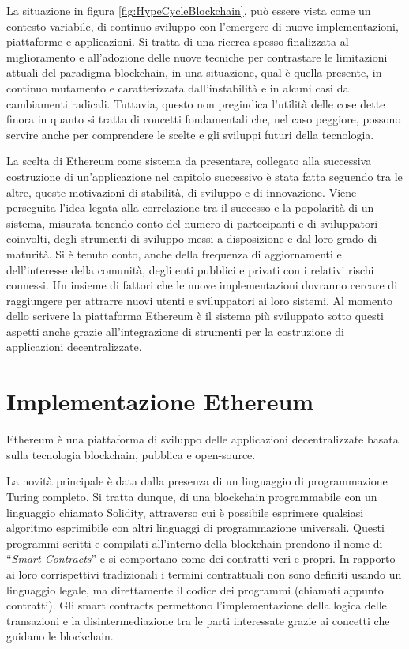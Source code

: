 La situazione in figura \ref{fig:HypeCycleBlockchain}, può essere vista come un contesto variabile, di continuo sviluppo con l’emergere di nuove implementazioni, piattaforme e applicazioni. Si tratta di una ricerca spesso finalizzata al miglioramento e all'adozione delle nuove tecniche per contrastare le limitazioni attuali del paradigma blockchain, in una situazione, qual è quella presente, in continuo mutamento e caratterizzata dall'instabilità e in alcuni casi da cambiamenti radicali. Tuttavia, questo non pregiudica l’utilità delle cose dette finora in quanto si tratta di concetti fondamentali che, nel caso peggiore, possono servire anche per comprendere le scelte e gli sviluppi futuri della tecnologia.

La scelta di Ethereum come sistema da presentare, collegato alla successiva costruzione di un’applicazione nel capitolo successivo è stata fatta seguendo tra le altre, queste motivazioni di stabilità, di sviluppo e di innovazione. Viene perseguita l'idea legata alla correlazione tra il successo e la popolarità di un sistema, misurata tenendo conto del numero di partecipanti e di sviluppatori coinvolti, degli strumenti di sviluppo messi a disposizione e dal loro grado di maturità. Si è tenuto conto, anche della frequenza di aggiornamenti e dell’interesse della comunità, degli enti pubblici e privati con i relativi rischi connessi. Un insieme di fattori che le nuove implementazioni dovranno cercare di raggiungere per attrarre nuovi utenti e sviluppatori ai loro sistemi. Al momento dello scrivere la piattaforma Ethereum è il sistema più sviluppato sotto questi aspetti anche grazie all'integrazione di strumenti per la costruzione di applicazioni decentralizzate.

\section{Implementazione Ethereum}

Ethereum è una piattaforma di sviluppo delle applicazioni decentralizzate basata sulla tecnologia blockchain, pubblica e open-source.

La novità principale è data dalla presenza di un linguaggio di programmazione Turing completo. Si tratta dunque, di una blockchain programmabile con un linguaggio chiamato Solidity, attraverso cui è possibile esprimere qualsiasi algoritmo esprimibile con altri linguaggi di programmazione universali. Questi programmi scritti e compilati all’interno della blockchain prendono il nome di “\emph{Smart Contracts}” e si comportano come dei contratti veri e propri. In rapporto ai loro corrispettivi tradizionali i termini contrattuali non sono definiti usando un linguaggio legale, ma direttamente il codice dei programmi (chiamati appunto contratti). Gli smart contracts permettono l’implementazione della logica delle transazioni e la disintermediazione tra le parti interessate grazie ai concetti che guidano le blockchain. 

